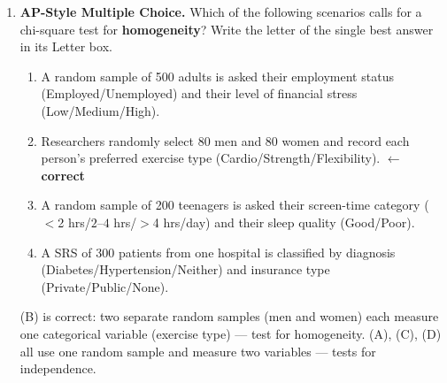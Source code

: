 \documentclass[10pt]{article}
\begin{document}
\begin{enumerate}
\begin{enumerate}[label=(\alph*)]
        \end{enumerate}

  \item \textbf{AP-Style Multiple Choice.} Which of the following scenarios calls for
        a chi-square test for \textbf{homogeneity}? Write the letter of the single best answer in its Letter box.

        \begin{enumerate}[label=(\Alph*)]
          \item A random sample of 500 adults is asked their employment status
                (Employed/Unemployed) and their level of financial stress (Low/Medium/High).
          \item Researchers randomly select 80 men and 80 women and record each person's
                preferred exercise type (Cardio/Strength/Flexibility).
                \textcolor{keyred}{\textbf{$\leftarrow$ correct}}
          \item A random sample of 200 teenagers is asked their screen-time category
                ($<$2 hrs/$2$--$4$ hrs/$>$4 hrs/day) and their sleep quality (Good/Poor).
          \item A SRS of 300 patients from one hospital is classified by diagnosis
                (Diabetes/Hypertension/Neither) and insurance type (Private/Public/None).
                      \par\nobreak\rule{0pt}{0.45in}\hfill{}
        \end{enumerate}

        \begin{teachernote}
            (B) is correct: two separate random samples (men and women) each measure
            one categorical variable (exercise type) --- test for homogeneity.
            (A), (C), (D) all use one random sample and measure two variables --- tests
            for independence.
        \end{teachernote}

\end{enumerate}
\end{document}

